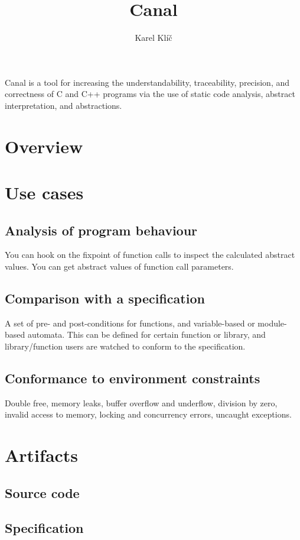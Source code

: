 \documentclass{article}
\title{Canal}
\author{Karel Klíč}
\begin{document}
\maketitle

Canal is a tool for increasing the understandability, traceability,
precision, and correctness of C and C++ programs via the use of static
code analysis, abstract interpretation, and abstractions.

\cleardoublepage
\tableofcontents

\cleardoublepage
\section{Overview}

\section{Use cases}
\subsection{Analysis of program behaviour}
You can hook on the fixpoint of function calls to inspect the
calculated abstract values.  You can get abstract values of function
call parameters.

\subsection{Comparison with a specification}
A set of pre- and post-conditions for functions, and variable-based or
module-based automata.  This can be defined for certain function or
library, and library/function users are watched to conform to the
specification.

\subsection{Conformance to environment constraints}
Double free, memory leaks, buffer overflow and underflow, division by
zero, invalid access to memory, locking and concurrency errors,
uncaught exceptions.

\section{Artifacts}
\subsection{Source code}
\subsection{Specification}
\end{document}
